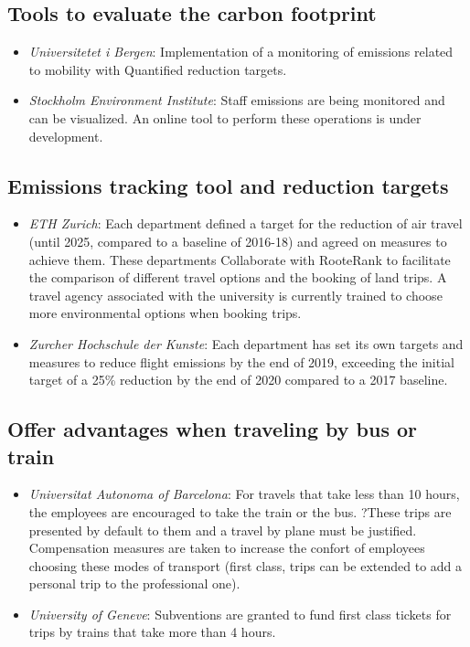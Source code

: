 \documentclass[version=3.21, pagesize, twoside=off, bibliography=totoc, DIV=calc, fontsize=12pt, a4paper, french, english]{scrartcl}
\begin{document}
\subsection{Tools to evaluate the carbon footprint}
\begin{itemize}
\item \emph{Universitetet i Bergen}: Implementation of a monitoring of emissions related to mobility with Quantified reduction targets. 
\item \emph{Stockholm Environment Institute}: Staff emissions are being monitored and can be visualized. An online tool to perform these operations is under development.
\end{itemize}

\subsection{Emissions tracking tool and reduction targets}
\begin{itemize}    
\item \emph{ETH Zurich}: Each department defined a target for the reduction of air travel (until 2025, compared to a baseline of 2016-18) and agreed on measures to achieve them. These departments Collaborate with RooteRank to facilitate the comparison of different travel options and the booking of land trips. A travel agency associated with the university is currently trained to choose more environmental options when booking trips.
\item \emph{Zurcher Hochschule der Kunste}: Each department has set its own targets and measures to reduce flight emissions by the end of 2019, exceeding the initial target of a 25\% reduction by the end of 2020 compared to a 2017 baseline.
\end{itemize}

\subsection{Offer advantages when traveling by bus or train}
\begin{itemize}
\item \emph{Universitat Autonoma of Barcelona}: For travels that take less than 10 hours, the employees are encouraged to take the train or the bus. ?These trips are presented by default to them and a travel by plane must be justified. Compensation measures are taken to increase the confort of employees choosing these modes of transport (first class, trips can be extended to add a personal trip to the professional one).
\item \emph{University of Geneve}: Subventions are granted to fund first class tickets for trips by trains that take more than 4 hours. 
\end{itemize}
\end{document}
